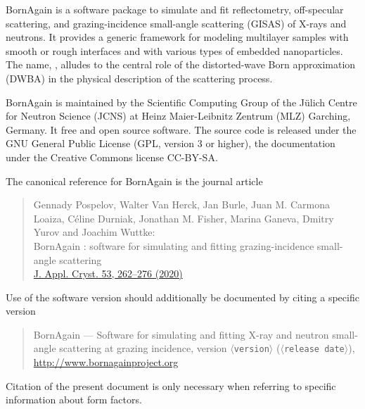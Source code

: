 

\cleardoublepage
{}


BornAgain is a software package
to simulate and fit
reflectometry, off-specular scattering,
and grazing-incidence small-angle scattering (GISAS)
of X-rays and neutrons.
It provides a generic framework
for modeling multilayer samples with smooth or
rough interfaces and with various types of embedded nanoparticles.
The name, \BornAgain,
alludes to the central role of the distorted-wave Born
approximation (DWBA) in the physical description of the
scattering process.

BornAgain is maintained
by the Scientific Computing Group
of the J\"ulich Centre for Neutron Science (JCNS)
at Heinz Maier-Leibnitz Zentrum (MLZ) Garching, Germany.
It free and open source software.
The source code is released under the GNU General Public License (GPL, version 3 or higher),
the documentation under the Creative Commons license CC-BY-SA.


The canonical reference for BornAgain is the journal article
\begin{quote}
Gennady Pospelov, Walter Van Herck, Jan Burle, Juan M. Carmona Loaiza,
Céline Durniak, Jonathan M. Fisher, Marina Ganeva, Dmitry Yurov and
Joachim Wuttke:\\
BornAgain : software for simulating and fitting
grazing-incidence small-angle scattering\\
\href{https://doi.org/10.1107/S1600576719016789}{J. Appl. Cryst. 53, 262–276 (2020)}
\end{quote}
Use of the software version should additionally be documented by citing a specific version
%
\begin{quote}
BornAgain --- Software for simulating and fitting
X-ray and neutron small-angle scattering at grazing incidence,
version $\langle$\texttt{version}$\rangle$ ($\langle$\texttt{release date}$\rangle$),\\
\url{http://www.bornagainproject.org}
\end{quote}
Citation of the present document is only necessary
when referring to specific information about form factors.
